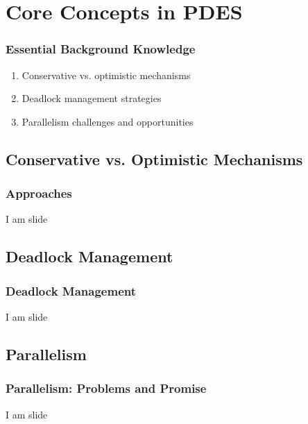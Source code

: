 % 

\section{Core Concepts in PDES}
%
\begin{frame}\frametitle{Essential Background Knowledge}
\begin{enumerate}
	\item Conservative vs. optimistic mechanisms
	\item Deadlock management strategies
	\item Parallelism challenges and opportunities
\end{enumerate}
\end{frame}

\subsection{Conservative vs. Optimistic Mechanisms}
\begin{frame}\frametitle{Approaches}
	I am slide
\end{frame}

\subsection{Deadlock Management}
\begin{frame}\frametitle{Deadlock Management}
	I am slide
\end{frame}

\subsection{Parallelism}
\begin{frame}\frametitle{Parallelism: Problems and Promise}
	I am slide
\end{frame}

\endinput  %
